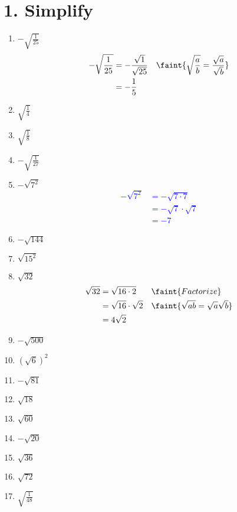 \documentclass{hw}
\begin{document}
\section*{\normalsize 1. Simplify}
\begin{enumerate}[label=\alph*.]
    \item $-\sqrt{\frac{1}{25}}$
        \textcolor{blue}{
        \begin{align*}
            -\sqrt{\frac{1}{25}} &= -\frac{\sqrt{1}}{\sqrt{25}} && \faint{\sqrt{\frac{a}{b}} = \frac{\sqrt{a}}{\sqrt{b}}} \\
                                 &= -\frac{1}{5}
        \end{align*}
        }
    \item $\sqrt{\frac{1}{4}}$
        \studentlargeworkspace
    \item $\sqrt{\frac{1}{8}}$
        \studentxlargeworkspace
    \item $-\sqrt{\frac{1}{27}}$
        \studentxlargeworkspace
    \item $-\sqrt{7^2}$
        \textcolor{blue}{
        \begin{align*}
            -\sqrt{7^2} &= -\sqrt{7 \cdot 7} \\
                        &= -\sqrt{7} \cdot \sqrt{7} \\
                        &= -7
        \end{align*}
        }
    \item $-\sqrt{144}$
        \studentlargeworkspace
    \item $\sqrt{15^2}$
        \studentlargeworkspace
    \item $\sqrt{32}$
        \textcolor{blue}{
        \begin{align*}
            \sqrt{32} &= \sqrt{16 \cdot 2} && \faint{Factorize} \\
                      &= \sqrt{16} \cdot \sqrt{2} && \faint{\sqrt{ab}=\sqrt{a}\sqrt{b}} \\
                      &= 4 \sqrt{2}
        \end{align*}
        }
    \item $-\sqrt{500}$
        \studentlargeworkspace
    \item $(\sqrt{6})^2$
        \studentlargeworkspace
    \item $-\sqrt{81}$
        \studentlargeworkspace
    \item $\sqrt{18}$
        \studentlargeworkspace
    \item $\sqrt{60}$
        \studentlargeworkspace
    \item $-\sqrt{20}$
        \studentlargeworkspace
    \item $\sqrt{36}$
        \studentlargeworkspace
    \item $\sqrt{72}$
        \studentxlargeworkspace
    \item $\sqrt{\frac{1}{48}}$
        \studentxlargeworkspace
    \end{enumerate}
\end{document}
